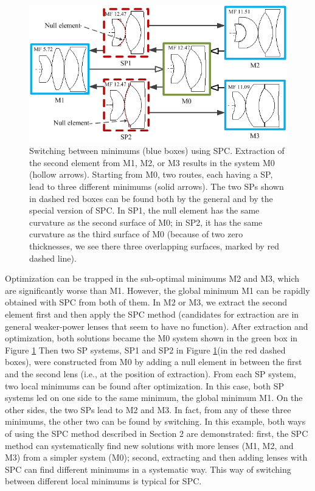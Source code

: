 \begin{figure}[h!]
    \centering
    \includegraphics[scale=0.68]{chapter-3/figures/WideAngleSwitch.png}
    \caption{Switching between minimums (blue boxes) using SPC. Extraction of the second element from M1, M2, or M3 results in the system M0 (hollow arrows). Starting from M0, two routes, each having a SP, lead to three different minimums (solid arrows). The two SPs shown in dashed red boxes can be found both by the general and by the special version of SPC. In SP1, the null element has the same curvature as the second surface of M0; in SP2, it has the same curvature as the third surface of M0 (because of two zero thicknesses, we see there three overlapping surfaces, marked by red dashed line).}
    \label{fig:wideangleSwitch}
\end{figure}

Optimization can be trapped in the sub-optimal minimums M2 and M3, which are significantly worse than M1. However, the global minimum M1 can be rapidly obtained with SPC from both of them. In M2 or M3, we extract the second element first and then apply the SPC method (candidates for extraction are in general weaker-power lenses that seem to have no function). After extraction and optimization, both solutions became the M0 system shown in the green box in Figure \ref{fig:wideangleSwitch} Then two SP systems, SP1 and SP2 in Figure \ref{fig:wideangleSwitch}(in the red dashed boxes), were constructed from M0 by adding a null element in between the first and the second lens (i.e., at the position of extraction). From each SP system, two local minimums can be found after optimization. In this case, both SP systems led on one side to the same minimum, the global minimum M1. On the other sides, the two SPs lead to M2 and M3. In fact, from any of these three minimums, the other two can be found by switching. In this example, both ways of using the SPC method described in Section 2 are demonstrated: first, the SPC method can systematically find new solutions with more lenses (M1, M2, and M3) from a simpler system (M0); second, extracting and then adding lenses with SPC can find different minimums in a systematic way. This way of switching between different local minimums is typical for SPC.
